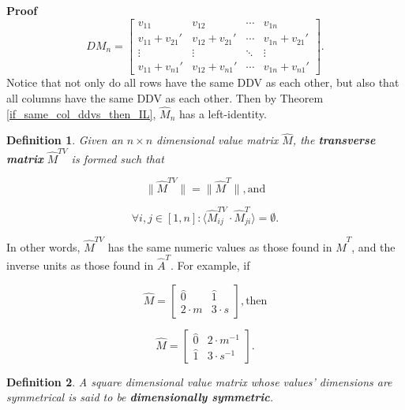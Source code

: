 \documentclass[10pt,letterpaper]{article}
\newtheorem{defn}{Definition}[section]
\newenvironment{proof}{\noindent\textbf{Proof} }{\qed \newline}
\newcommand{\qed}{\nobreak \ifvmode \relax \else
      \ifdim\lastskip<1.5em \hskip-\lastskip
      \hskip1.5em plus0em minus0.5em \fi \nobreak
      \vrule height0.75em width0.5em depth0.25em\fi}
\numberwithin{equation}{section}
\begin{document}
\begin{proof}
\[ DM_n = \left[ \begin{matrix} 
  v_{11} & v_{12} & \cdots & v_{1n} \\
  v_{11} + v_{21} \prime & v_{12} + v_{21} \prime & \cdots & v_{1n} + v_{21} \prime \\
  \vdots & \vdots & \ddots & \vdots \\
  v_{11} + v_{n1} \prime & v_{12} + v_{n1} \prime & \cdots & v_{1n} + v_{n1} \prime
\end{matrix} \right] . \] Notice that not only do all rows have the
same DDV as each other, but also that all columns have the same DDV as
each other.  Then by Theorem \ref{if_same_col_ddvs_then_IL}, $\hat
M_n$ has a left-identity.\end{proof}

\begin{defn}Given an $n \times n$ dimensional value matrix $\hat M$,
  the \textbf{transverse matrix} $\hat M^{TV}$ is formed such that

  \begin{equation} \label{transverse_definition_part_1} \| \hat M^{TV}
    \| = \| \hat M^T \| , \mbox{and} \end{equation}

\begin{equation} \label{transverse_definition_part_2} \forall i,j \in
  [1, n] : \langle \hat M^{TV}_{ij} \cdot \hat M^T_{ji} \rangle =
  \emptyset . \end{equation} \end{defn}

In other words, $\hat M^{TV}$ has the same numeric values as those
found in $\hat M^T$, and the inverse units as those found in $\hat
A^T$.  For example, if

\[ \hat M = \left[ \begin{matrix}
 \hat 0 & \hat 1 \\
 2 \cdot m & 3 \cdot s
 \end{matrix} \right] , \mbox{then} \]

\[ \hat M = \left[ \begin{matrix}
 \hat 0 & 2 \cdot m^{-1} \\
 \hat 1 & 3 \cdot s^{-1}
 \end{matrix} \right] . \]

\begin{defn}A square dimensional value matrix whose values' dimensions
  are symmetrical is said to be \textbf{dimensionally
    symmetric}. \end{defn}
\end{document}
